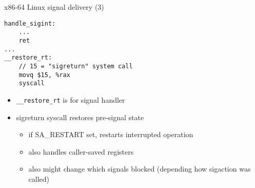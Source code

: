 \begin{frame}[fragile,label=sigReturn]{x86-64 Linux signal delivery (3)}
\begin{lstlisting}
handle_sigint:
    ...
    ret
...
__restore_rt:
    // 15 = "sigreturn" system call
    movq $15, %rax
    syscall
\end{lstlisting}
\begin{itemize}
\item {\tt \_\_restore\_rt} is  for signal handler
\item sigreturn syscall restores pre-signal state
\begin{itemize}
    \item if SA\_RESTART set, restarts interrupted operation
    \item also handles caller-saved registers
    \item also might change which signals blocked (depending how sigaction was called)
\end{itemize}
\end{itemize}
\end{frame}


